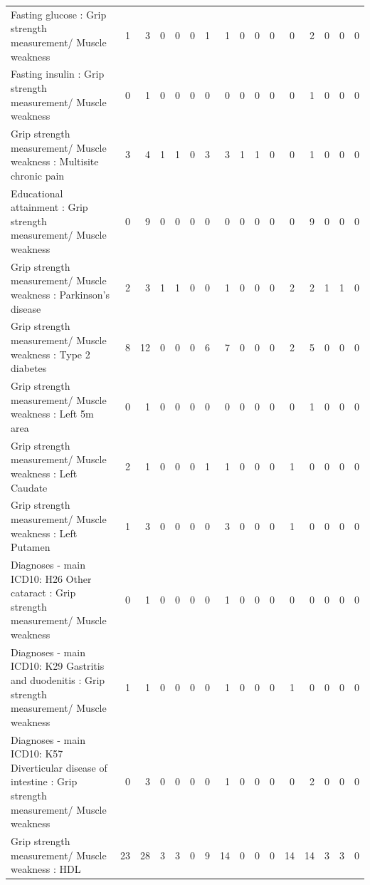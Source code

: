 \begin{table}[ht]
\begin{tabular}{lrrrrrrrrrrrrrrr}
  Fasting glucose : Grip strength measurement/ Muscle weakness &   1 &   3 &   0 &   0 &   0 &   1 &   1 &   0 &   0 &   0 &   0 &   2 &   0 &   0 &   0 \\ 
  Fasting insulin : Grip strength measurement/ Muscle weakness &   0 &   1 &   0 &   0 &   0 &   0 &   0 &   0 &   0 &   0 &   0 &   1 &   0 &   0 &   0 \\ 
  Grip strength measurement/ Muscle weakness : Multisite chronic pain &   3 &   4 &   1 &   1 &   0 &   3 &   3 &   1 &   1 &   0 &   0 &   1 &   0 &   0 &   0 \\ 
  Educational attainment : Grip strength measurement/ Muscle weakness &   0 &   9 &   0 &   0 &   0 &   0 &   0 &   0 &   0 &   0 &   0 &   9 &   0 &   0 &   0 \\ 
  Grip strength measurement/ Muscle weakness : Parkinson's disease &   2 &   3 &   1 &   1 &   0 &   0 &   1 &   0 &   0 &   0 &   2 &   2 &   1 &   1 &   0 \\ 
  Grip strength measurement/ Muscle weakness : Type 2 diabetes &   8 &  12 &   0 &   0 &   0 &   6 &   7 &   0 &   0 &   0 &   2 &   5 &   0 &   0 &   0 \\ 
  Grip strength measurement/ Muscle weakness : Left 5m area &   0 &   1 &   0 &   0 &   0 &   0 &   0 &   0 &   0 &   0 &   0 &   1 &   0 &   0 &   0 \\ 
  Grip strength measurement/ Muscle weakness : Left Caudate &   2 &   1 &   0 &   0 &   0 &   1 &   1 &   0 &   0 &   0 &   1 &   0 &   0 &   0 &   0 \\ 
  Grip strength measurement/ Muscle weakness : Left Putamen &   1 &   3 &   0 &   0 &   0 &   0 &   3 &   0 &   0 &   0 &   1 &   0 &   0 &   0 &   0 \\ 
  Diagnoses - main ICD10: H26 Other cataract : Grip strength measurement/ Muscle weakness &   0 &   1 &   0 &   0 &   0 &   0 &   1 &   0 &   0 &   0 &   0 &   0 &   0 &   0 &   0 \\ 
  Diagnoses - main ICD10: K29 Gastritis and duodenitis : Grip strength measurement/ Muscle weakness &   1 &   1 &   0 &   0 &   0 &   0 &   1 &   0 &   0 &   0 &   1 &   0 &   0 &   0 &   0 \\ 
  Diagnoses - main ICD10: K57 Diverticular disease of intestine : Grip strength measurement/ Muscle weakness &   0 &   3 &   0 &   0 &   0 &   0 &   1 &   0 &   0 &   0 &   0 &   2 &   0 &   0 &   0 \\ 
  Grip strength measurement/ Muscle weakness : HDL &  23 &  28 &   3 &   3 &   0 &   9 &  14 &   0 &   0 &   0 &  14 &  14 &   3 &   3 &   0 \\ 

\end{tabular}
\end{table}
